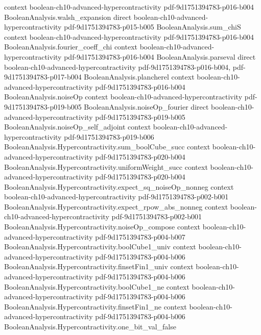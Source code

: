 \begin{theorem}
  {context}
  {boolean-ch10-advanced-hypercontractivity}
  {pdf-9d1751394783-p016-b004}
\proofstep
  {BooleanAnalysis.walsh_expansion}
  {direct}
  {boolean-ch10-advanced-hypercontractivity}
  {pdf-9d1751394783-p015-b005}
\proofstep
  {BooleanAnalysis.sum_chiS}
  {context}
  {boolean-ch10-advanced-hypercontractivity}
  {pdf-9d1751394783-p016-b004}
\proofstep
  {BooleanAnalysis.fourier_coeff_chi}
  {context}
  {boolean-ch10-advanced-hypercontractivity}
  {pdf-9d1751394783-p016-b004}
\proofstep
  {BooleanAnalysis.parseval}
  {direct}
  {boolean-ch10-advanced-hypercontractivity}
  {pdf-9d1751394783-p016-b004,
    pdf-9d1751394783-p017-b004}
\proofstep
  {BooleanAnalysis.plancherel}
  {context}
  {boolean-ch10-advanced-hypercontractivity}
  {pdf-9d1751394783-p016-b004}
\proofstep
  {BooleanAnalysis.noiseOp}
  {context}
  {boolean-ch10-advanced-hypercontractivity}
  {pdf-9d1751394783-p019-b005}
\proofstep
  {BooleanAnalysis.noiseOp_fourier}
  {direct}
  {boolean-ch10-advanced-hypercontractivity}
  {pdf-9d1751394783-p019-b005}
\proofstep
  {BooleanAnalysis.noiseOp_self_adjoint}
  {context}
  {boolean-ch10-advanced-hypercontractivity}
  {pdf-9d1751394783-p019-b006}
\proofstep
  {BooleanAnalysis.Hypercontractivity.sum_boolCube_succ}
  {context}
  {boolean-ch10-advanced-hypercontractivity}
  {pdf-9d1751394783-p020-b004}
\proofstep
  {BooleanAnalysis.Hypercontractivity.uniformWeight_succ}
  {context}
  {boolean-ch10-advanced-hypercontractivity}
  {pdf-9d1751394783-p020-b004}
\proofstep
  {BooleanAnalysis.Hypercontractivity.expect_sq_noiseOp_nonneg}
  {context}
  {boolean-ch10-advanced-hypercontractivity}
  {pdf-9d1751394783-p002-b001}
\proofstep
  {BooleanAnalysis.Hypercontractivity.expect_rpow_abs_nonneg}
  {context}
  {boolean-ch10-advanced-hypercontractivity}
  {pdf-9d1751394783-p002-b001}
\proofstep
  {BooleanAnalysis.Hypercontractivity.noiseOp_compose}
  {context}
  {boolean-ch10-advanced-hypercontractivity}
  {pdf-9d1751394783-p004-b007}
\proofstep
  {BooleanAnalysis.Hypercontractivity.boolCube1_univ}
  {context}
  {boolean-ch10-advanced-hypercontractivity}
  {pdf-9d1751394783-p004-b006}
\proofstep
  {BooleanAnalysis.Hypercontractivity.finsetFin1_univ}
  {context}
  {boolean-ch10-advanced-hypercontractivity}
  {pdf-9d1751394783-p004-b006}
\proofstep
  {BooleanAnalysis.Hypercontractivity.boolCube1_ne}
  {context}
  {boolean-ch10-advanced-hypercontractivity}
  {pdf-9d1751394783-p004-b006}
\proofstep
  {BooleanAnalysis.Hypercontractivity.finsetFin1_ne}
  {context}
  {boolean-ch10-advanced-hypercontractivity}
  {pdf-9d1751394783-p004-b006}
\proofstep
  {BooleanAnalysis.Hypercontractivity.one_bit_val_false}

\end{theorem}
